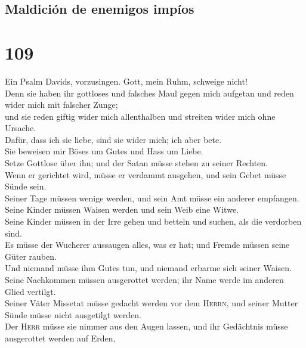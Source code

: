 \hypertarget{maldiciuxf3n-de-enemigos-impuxedos}{%
\subsection{Maldición de enemigos
impíos}\label{maldiciuxf3n-de-enemigos-impuxedos}}

\hypertarget{section-108}{%
\section{109}\label{section-108}}

 Ein Psalm Davids, vorzusingen. Gott, mein Ruhm, schweige
nicht!\\
 Denn sie haben ihr gottloses und falsches Maul gegen mich
aufgetan und reden wider mich mit falscher Zunge;\\
 und sie reden giftig wider mich allenthalben und streiten
wider mich ohne Ursache.\\
 Dafür, dass ich sie liebe, sind sie wider mich; ich aber
bete.\\
 Sie beweisen mir Böses um Gutes und Hass um Liebe.\\
 Setze Gottlose über ihn; und der Satan müsse stehen zu
seiner Rechten.\\
 Wenn er gerichtet wird, müsse er verdammt ausgehen, und
sein Gebet müsse Sünde sein.\\
 Seiner Tage müssen wenige werden, und sein Amt müsse ein
anderer empfangen.\\
 Seine Kinder müssen Waisen werden und sein Weib eine
Witwe.\\
 Seine Kinder müssen in der Irre gehen und betteln und
suchen, als die verdorben sind.\\
 Es müsse der Wucherer aussaugen alles, was er hat; und
Fremde müssen seine Güter rauben.\\
 Und niemand müsse ihm Gutes tun, und niemand erbarme
sich seiner Waisen.\\
 Seine Nachkommen müssen ausgerottet werden; ihr Name
werde im anderen Glied vertilgt.\\
 Seiner Väter Missetat müsse gedacht werden vor dem
\textsc{Herrn}, und seiner Mutter Sünde müsse nicht ausgetilgt werden.\\
 Der \textsc{Herr} müsse sie nimmer aus den Augen lassen,
und ihr Gedächtnis müsse ausgerottet werden auf Erden,\\
